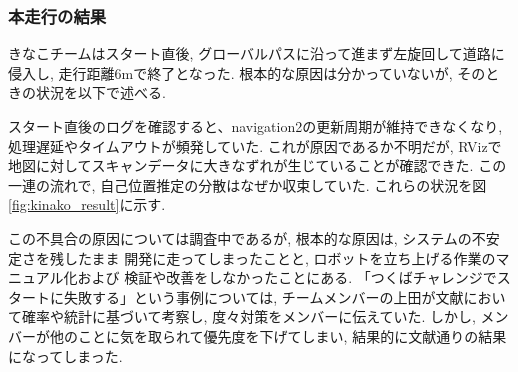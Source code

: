 \subsubsection{本走行の結果}
きなこチームはスタート直後, 
グローバルパスに沿って進まず左旋回して道路に侵入し, 
走行距離6mで終了となった. 
根本的な原因は分かっていないが, 
そのときの状況を以下で述べる. 

スタート直後のログを確認すると、navigation2の更新周期が維持できなくなり, 
処理遅延やタイムアウトが頻発していた.
これが原因であるか不明だが, 
RVizで地図に対してスキャンデータに大きなずれが生じていることが確認できた. 
この一連の流れで, 自己位置推定の分散はなぜか収束していた. 
これらの状況を図\ref{fig:kinako_result}に示す.

この不具合の原因については調査中であるが, 
根本的な原因は, システムの不安定さを残したまま
開発に走ってしまったことと, 
ロボットを立ち上げる作業のマニュアル化および
検証や改善をしなかったことにある. 
「つくばチャレンジでスタートに失敗する」という事例については, 
チームメンバーの上田が文献\cite{上田確率}において確率や統計に基づいて考察し, 
度々対策をメンバーに伝えていた. しかし, 
メンバーが他のことに気を取られて優先度を下げてしまい, 
結果的に文献通りの結果になってしまった. 


